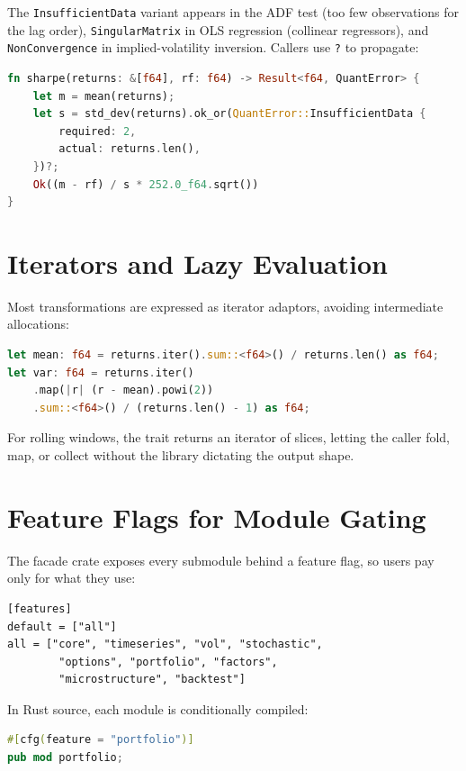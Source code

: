 The \texttt{InsufficientData} variant appears in the ADF test
(too few observations for the lag order), \texttt{SingularMatrix} in
OLS regression (collinear regressors), and \texttt{NonConvergence} in
implied-volatility inversion. Callers use \texttt{?} to propagate:

\begin{lstlisting}[language=Rust]
fn sharpe(returns: &[f64], rf: f64) -> Result<f64, QuantError> {
    let m = mean(returns);
    let s = std_dev(returns).ok_or(QuantError::InsufficientData {
        required: 2,
        actual: returns.len(),
    })?;
    Ok((m - rf) / s * 252.0_f64.sqrt())
}
\end{lstlisting}

\section{Iterators and Lazy Evaluation}

Most transformations are expressed as iterator adaptors, avoiding
intermediate allocations:

\begin{lstlisting}[language=Rust]
let mean: f64 = returns.iter().sum::<f64>() / returns.len() as f64;
let var: f64 = returns.iter()
    .map(|r| (r - mean).powi(2))
    .sum::<f64>() / (returns.len() - 1) as f64;
\end{lstlisting}

For rolling windows, the  trait returns an
iterator of slices, letting the caller fold, map, or collect without
the library dictating the output shape.

\section{Feature Flags for Module Gating}

The  facade crate exposes every submodule behind a
feature flag, so users pay only for what they use:

\begin{lstlisting}
[features]
default = ["all"]
all = ["core", "timeseries", "vol", "stochastic",
        "options", "portfolio", "factors",
        "microstructure", "backtest"]
\end{lstlisting}

In Rust source, each module is conditionally compiled:

\begin{lstlisting}[language=Rust]
#[cfg(feature = "portfolio")]
pub mod portfolio;
\end{lstlisting}

